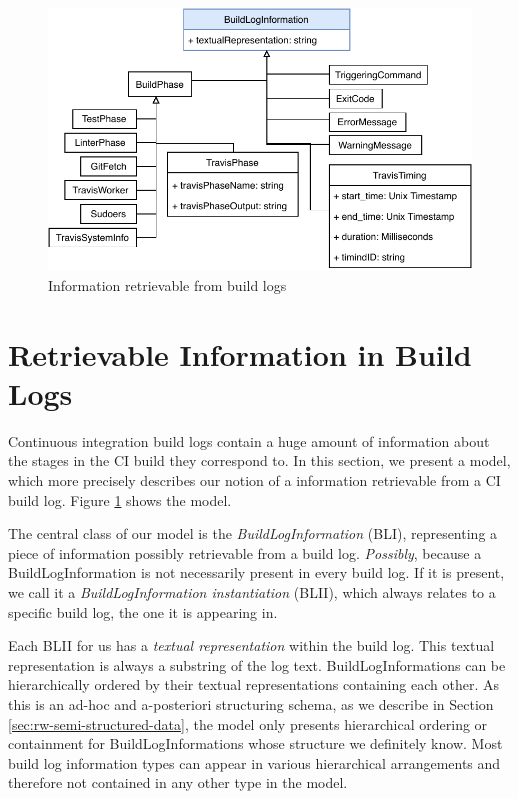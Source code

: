\documentclass[\myrootdir/main.tex]{subfiles}
\begin{document}
\begin{figure}[htbp]
	\centering
	\includegraphics[width=\textwidth, clip]{img/build-log-information.pdf}
	\caption{Information retrievable from build logs}
	\label{fig:build-log-information}
\end{figure}
\section{Retrievable Information in Build Logs}
\label{sec:bli}
Continuous integration build logs contain a huge amount of information about the stages in the CI build they correspond to.
In this section, we present a model, which more precisely describes our notion of a information retrievable from a CI build log.
Figure \ref{fig:build-log-information} shows the model.

The central class of our model is the \emph{BuildLogInformation} (BLI), representing a piece of information possibly retrievable from a build log.
\emph{Possibly}, because a BuildLogInformation is not necessarily present in every build log.
If it is present, we call it a \emph{BuildLogInformation instantiation} (BLII), which always relates to a specific build log, the one it is appearing in.

Each BLII for us has a \emph{textual representation} within the build log.
This textual representation is always a substring of the log text.
BuildLogInformations can be hierarchically ordered by their textual representations containing each other.
As this is an ad-hoc and a-posteriori structuring schema, as we describe in Section \ref{sec:rw-semi-structured-data}, the model only presents hierarchical ordering or containment for BuildLogInformations whose structure we definitely know.
Most build log information types can appear in various hierarchical arrangements and therefore not contained in any other type in the model.
\end{document}
